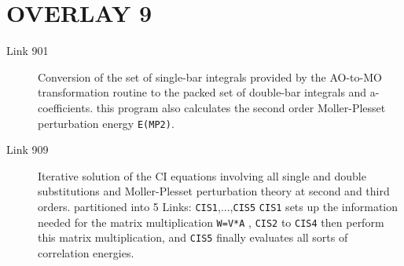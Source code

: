 \section{\sf OVERLAY 9}
\begin{description}
\item[Link 901]
Conversion of the set of single-bar integrals provided by the
AO-to-MO transformation routine to the packed set of
double-bar integrals and a-coefficients. this program also
calculates the second order Moller-Plesset perturbation
energy {\tt E(MP2)}.
\item[Link 909]
Iterative solution of the CI equations involving all single and
double substitutions and Moller-Plesset perturbation theory at
second and third orders.
partitioned into 5 Links: {\tt CIS1},...,{\tt CIS5}
{\tt CIS1} sets up the information needed for the matrix multiplication
{\tt W=V*A} , {\tt CIS2} to {\tt CIS4} then perform this matrix multiplication,
and {\tt CIS5} finally evaluates all sorts of correlation energies.
\end{description}
